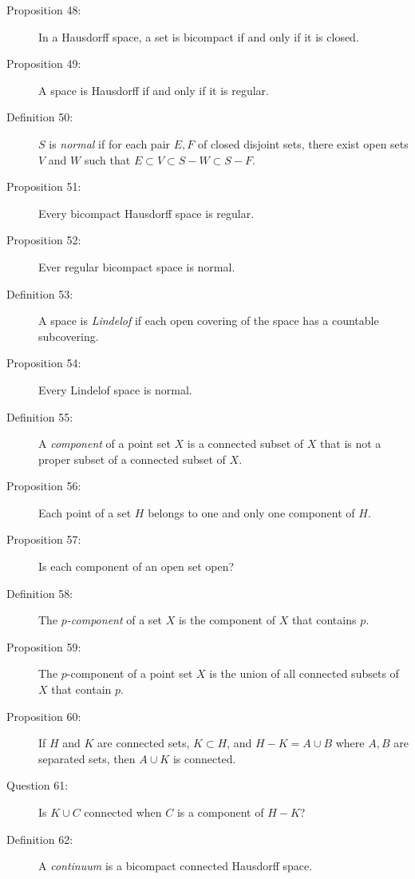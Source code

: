 \documentclass{article}
\begin{document}
\begin{description}
  \item[Proposition 48:] In a Hausdorff space, a set is bicompact if and only if it is closed.

  \item[Proposition 49:] A space is Hausdorff if and only if it is regular.

  \item[Definition 50:] $S$ is \emph{normal} if for each pair $E,F$ of closed disjoint sets, there exist open sets $V$ and $W$ such that $E \subset V \subset S - W \subset S - F$.

  \item[Proposition 51:] Every bicompact Hausdorff space is regular.

  \item[Proposition 52:] Ever regular bicompact space is normal.

  \item[Definition 53:] A space is \emph{Lindelof} if each open covering of the space has a countable subcovering.

  \item[Proposition 54:] Every Lindelof space is normal.

  \item[Definition 55:] A \emph{component} of a point set $X$ is a connected subset of $X$ that is not a proper subset of a connected subset of $X$.

  \item[Proposition 56:] Each point of a set $H$ belongs to one and only one component of $H$.

  \item[Proposition 57:] Is each component of an open set open?

  \item[Definition 58:] The \emph{$p$-component} of a set $X$ is the component of $X$ that contains $p$.

  \item[Proposition 59:] The $p$-component of a point set $X$ is the union of all connected subsets of $X$ that contain $p$.

  \item[Proposition 60:] If $H$ and $K$ are connected sets, $K \subset H$, and $H - K = A \cup B$ where $A,B$ are separated sets, then $A \cup K$ is connected.

  \item[Question 61:] Is $K \cup C$ connected when $C$ is a component of $H - K$?

  \item[Definition 62:] A \emph{continuum} is a bicompact connected Hausdorff space.


\end{description}
\end{document}
